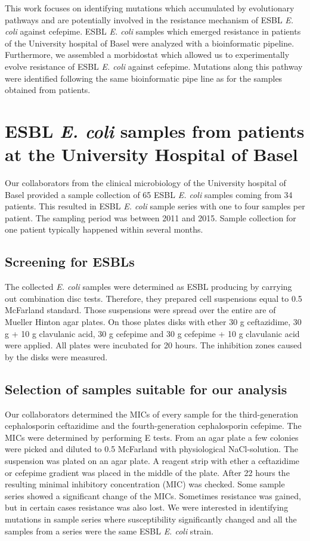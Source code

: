 This work focuses on identifying mutations which accumulated by evolutionary pathways and are potentially involved in the resistance mechanism of ESBL \textit{E. coli} against cefepime. ESBL \textit{E. coli} samples which emerged resistance in patients of the University hospital of Basel were analyzed with a bioinformatic pipeline. Furthermore, we assembled a morbidostat which allowed us to experimentally evolve resistance of ESBL \textit{E. coli} against cefepime. Mutations along this pathway were identified following the same bioinformatic pipe line as for the samples obtained from patients.

\section{ESBL \textit{E. coli} samples from patients at the University Hospital of Basel}
Our collaborators from the clinical microbiology of the University hospital of Basel provided a sample collection of 65 ESBL \textit{E. coli} samples coming from 34 patients. This resulted in ESBL \textit{E. coli} sample series with one to four samples per patient. The sampling period was between 2011 and 2015. Sample collection for one patient typically happened within several months.
\label{section:sample_collection}

\subsection{Screening for ESBLs}
The collected \textit{E. coli} samples were determined as ESBL producing by carrying out combination disc tests. Therefore, they prepared cell suspensions equal to 0.5 McFarland standard. Those suspensions were spread over the entire are of Mueller Hinton agar plates. On those plates disks with ether 30 \textmu g ceftazidime, 30 \textmu g + 10 \textmu g clavulanic acid, 30 \textmu g cefepime and 30 \textmu g cefepime + 10 \textmu g clavulanic acid were applied. All plates were incubated for 20 hours. The inhibition zones caused by the disks were measured. 

\subsection{Selection of samples suitable for our analysis}
Our collaborators determined the MICs of every sample for the third-generation cephalosporin ceftazidime and the fourth-generation cephalosporin cefepime. The MICs were determined by performing E tests. From an agar plate a few colonies were picked and diluted to 0.5 McFarland with physiological NaCl-solution. The suspension was plated on an agar plate. A reagent strip with ether a ceftazidime or cefepime gradient was placed in the middle of the plate. After 22 hours the resulting minimal inhibitory concentration (MIC) was checked. 
Some sample series showed a significant change of the MICs. Sometimes resistance was gained, but in certain cases resistance was also lost. We were interested in identifying mutations in sample series where susceptibility significantly changed and all the samples from a series were the same ESBL \textit{E. coli} strain.
\label{section:samples}

